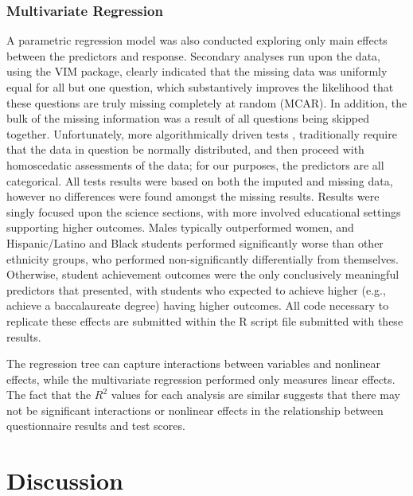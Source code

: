 \documentclass{article}\usepackage[]{graphicx}\usepackage[]{color}
\begin{document}
\subsubsection{Multivariate Regression}

A parametric regression model was also conducted exploring only main effects between the predictors and response. Secondary analyses run upon the data, using the VIM package, clearly indicated that the missing data was uniformly equal for all but one question, which substantively improves the likelihood that these questions are truly missing completely at random (MCAR). In addition, the bulk of the missing information was a result of all questions being skipped together. Unfortunately, more algorithmically driven tests \cite{little,KB}, traditionally require that the data in question be normally distributed, and then proceed with homoscedatic assessments of the data; for our purposes, the predictors are all categorical. All tests results were based on both the imputed and missing data, however no differences were found amongst the missing results. Results were singly focused upon the science sections, with more involved educational settings supporting higher outcomes. Males typically outperformed women, and Hispanic/Latino and Black students performed significantly worse than other ethnicity groups, who performed non-significantly differentially from themselves. Otherwise, student achievement outcomes were the only conclusively meaningful predictors that presented, with students who expected to achieve higher (e.g., achieve a baccalaureate degree) having higher outcomes. All code necessary to replicate these effects are submitted within the R script file submitted with these results.

The regression tree can capture interactions between variables and nonlinear effects, while the multivariate regression performed only measures linear effects. The fact that the $R^2$ values for each analysis are similar suggests that there may not be significant interactions or nonlinear effects in the relationship between questionnaire results and test scores. 

\section{Discussion}
\end{document}
